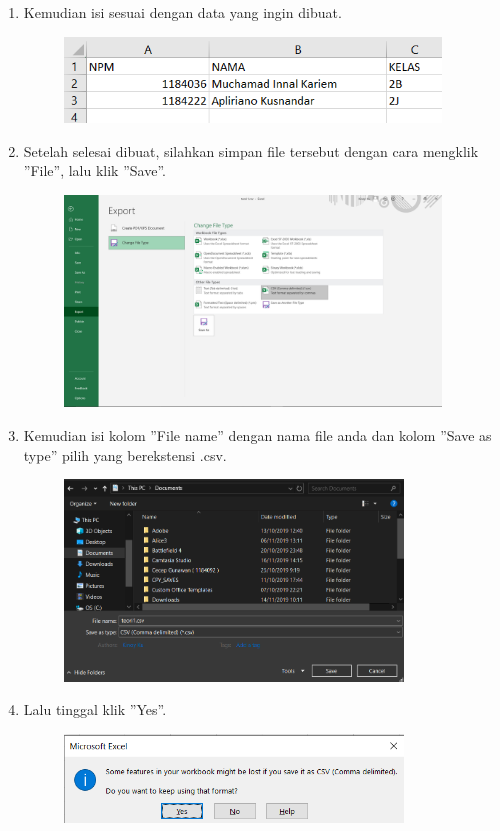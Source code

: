 \begin{enumerate}
\begin{enumerate}
		\item Kemudian isi sesuai dengan data yang ingin dibuat.
		
		\begin{figure}[!htbp]
			\includegraphics[width=10cm]{figures/a2.PNG}
			\centering
		\end{figure}
		
		\item Setelah selesai dibuat, silahkan simpan file tersebut dengan cara mengklik ''File'', lalu klik ''Save''.
		
		\begin{figure}[!htbp]
			\includegraphics[width=10cm]{figures/a3.PNG}
			\centering
		\end{figure}
		\newpage
		
		\item Kemudian isi kolom ''File name'' dengan nama file anda dan kolom ''Save as type'' pilih yang berekstensi .csv.
		
		\begin{figure}[!htbp]
			\includegraphics[width=9cm]{figures/a4.PNG}
			\centering
		\end{figure}
		
		\item Lalu tinggal klik ''Yes''.
			\begin{figure}[!htbp]
			\includegraphics[width=9cm]{figures/t6.png}
			\centering
		\end{figure}
	

\end{enumerate}
\end{enumerate}
